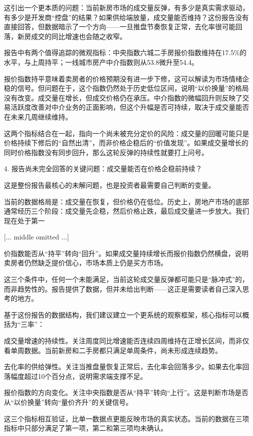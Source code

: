 \documentclass[11pt]{ctexart}
\begin{document}
这引出一个更本质的问题：当前新房市场的成交量反弹，有多少是真实需求驱动，有多少是开发商“控盘”的结果？如果供给端放量，成交量能否维持？这份报告没有直接回答，但数据暗示了一个方向——一旦推盘节奏恢复正常，去化率很可能回落，新房成交的同比增速也会随之收窄。

报告中有两个值得追踪的微观指标：中央指数六城二手房报价指数维持在17.5\%的水平，与上周持平；一线城市房产中介指数则从53.8微升至54.4。

报价指数持平意味着卖房者的价格预期没有进一步下修，这可以解读为市场情绪企稳的信号。但问题在于，这个指数仍然处于历史低位区间，说明“以价换量”的格局没有改变。成交量在增长，但成交价格仍在承压。中介指数的微幅回升则反映了交易活跃度改善对中介业务的正面影响，但这个升幅是否可持续，取决于成交量能否在未来几周继续维持。

这两个指标结合在一起，指向一个尚未被充分定价的风险：成交量的回暖可能只是价格持续下修后的“自然出清”，而非价格企稳后的“价值发现”。如果成交量增长的同时价格指数没有同步回升，那么这轮反弹的持续性就要打上问号。

4. 报告尚未完全回答的关键问题：成交量能否在价格企稳前持续？

这是整份报告最核心的未解问题，也是投资者最需要自己判断的变量。

当前的数据格局是：成交量在恢复，但价格仍在低位。历史上，房地产市场的底部通常经历三个阶段：成交量先企稳，然后价格止跌，最后成交量进一步放大。我们现在处于第一

[... middle omitted ...]

价指数能否从“持平”转向“回升”。如果成交量持续增长而报价指数仍然横盘，说明卖房者仍然缺乏提价信心，市场本质上仍是买方市场。

这三个条件中，任何一个未能满足，当前这轮成交量反弹都可能只是“脉冲式”的，而非趋势性的。报告提供了数据，但并未给出判断——这正是需要读者自己深入思考的地方。

基于这份报告的数据结构，我们建议建立一个更系统的观察框架，核心指标可以概括为“三率”：

成交量增速的持续性。关注周度同比增速能否连续四周维持在正增长区间，而非仅看单周数据。当前新房和二手房都只满足单周条件，尚未形成连续趋势。

去化率的供给弹性。关注当推盘量恢复正常后，去化率会回落多少。如果去化率回落幅度超过10个百分点，说明需求端支撑不足。

报价指数的方向变化。关注中央指数是否从“持平”转向“上行”。这是判断市场是否从“以价换量”转向“量价齐升”的关键信号。

这三个指标相互验证，比单一数据点更能反映市场的真实状态。当前的数据在三项指标中只部分满足了第一项，第二和第三项均未确认。
\end{document}
